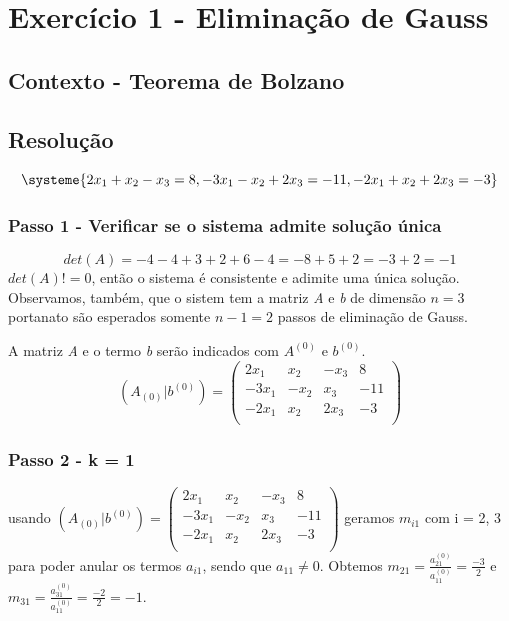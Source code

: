 \documentclass{article}
\begin{document}
\section{Exercício 1 - Eliminação de Gauss}

\subsection{Contexto - Teorema de Bolzano}

\subsection{Resolução}
    \[
        \systeme{2x_1 + x_2 - x_3 = 8, -3x_1 - x_2 + 2x_3 = -11, -2x_1 + x_2 + 2x_3 = -3}
    \]
    \subsubsection{Passo 1 - Verificar se o sistema admite solução única}
        \[
            det(A) = -4 - 4 + 3 + 2 + 6 - 4 = -8 + 5 + 2 = -3 + 2 = -1
        \]
        $det(A) != 0$, então o sistema é consistente e adimite uma única solução. Observamos, também, que o sistem tem a matriz \textit{A} e \textit{b} de dimensão $n = 3$ portanato são esperados somente $n-1 = 2$ passos de eliminação de Gauss.

        A matriz \textit{A} e o termo \textit{b} serão indicados com $A^{(0)}$ e $b^{(0)}$.
        \[
            (A_{(0)}|b^{(0)}) =
            \left(
            \begin{array}{ccc|c}
                2x_1 & x_2 & -x_3 & 8 \\
                -3x_1 & -x_2 & x_3 & -11 \\
                -2x_1 & x_2 & 2x_3 & -3 \\
            \end{array}
            \right)
        \]
    \subsubsection{Passo 2 - k = 1}
        usando $(A_{(0)}|b^{(0)}) =
            \left(
            \begin{array}{ccc|c}
                2x_1 & x_2 & -x_3 & 8 \\
                -3x_1 & -x_2 & x_3 & -11 \\
                -2x_1 & x_2 & 2x_3 & -3 \\
            \end{array}
            \right)$ geramos $m_{i1}$ com i = 2, 3 para poder anular os termos $a_{i1}$, sendo que $a_{11} \neq 0$. Obtemos $m_{21} = \frac{a^{(0)}_{21}}{a^{(0)}_{11}} = \frac{-3}{2}$ e $m_{31} = \frac{a^{(0)}_{31}}{a^{(0)}_{11}} = \frac{-2}{2} = -1$.
\end{document}
